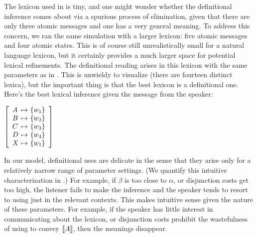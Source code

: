 \documentclass[12pt,twoside]{article}
\renewcommand{\_}{\textbf{\textunderscore\hspace{-4pt}\textunderscore\hspace{-3pt}\textunderscore\hspace{-4pt}\textunderscore}\hspace{0.5pt}}			%
\begin{document}
The lexicon used in  is tiny, and one might wonder
whether the definitional inference comes about via a spurious process
of elimination, given that there are only three atomic messages and
one has a very general meaning. To address this concern, we ran the
same simulation with a larger lexicon: five atomic messages and four
atomic states. This is of course still unrealistically small for a
natural language lexicon, but it certainly provides a much larger
space for potential lexical refinements. The definitional reading
arises in this lexicon with the same parameters as in
. This is unwieldy to visualize (there are fourteen
distinct lexica), but the important thing is that the best lexicon is
a definitional one. Here's the best lexical inference given the
message  from the speaker:
%
\begin{exe}
\ex\label{def-lex-large}
  $\left[
    \begin{array}[c]{l@{ \ \mapsto \ }l}
      A & \set{w_{1}} \\
      B & \set{w_{2}} \\
      C & \set{w_{3}} \\
      D & \set{w_{4}} \\
      X & \set{w_{1}}
    \end{array}
  \right]$
\end{exe}

In our model, definitional uses are delicate in the sense that they
arise only for a relatively narrow range of parameter settings. (We
quantify this intuitive characterization in
.) For example, if $\beta$ is too close
to $\alpha$, or disjunction costs get too high, the listener fails to
make the inference and the speaker tends to resort to using just
 in the relevant contexts. This makes intuitive sense given
the nature of these parameters. For example, if the speaker has little
interest in communicating about the lexicon, or disjunction costs
prohibit the wastefulness of using  to convey $\llbracket A\rrbracket$,
then the meanings disappear. 
\end{document}

